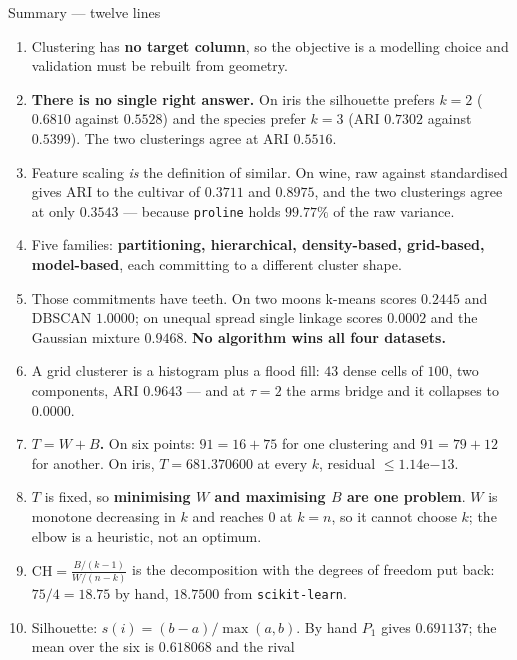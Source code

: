 \documentclass[aspectratio=169]{beamer}
\begin{document}
\begin{frame}[shrink=22]{Summary --- twelve lines}
  \begin{enumerate}\small
    \item Clustering has \textbf{no target column}, so the objective is a
      modelling choice and validation must be rebuilt from geometry.
    \item \textbf{There is no single right answer.} On iris the silhouette
      prefers $k=2$ ($0.6810$ against $0.5528$) and the species prefer $k=3$
      (ARI $0.7302$ against $0.5399$). The two clusterings agree at ARI
      $\mathbf{0.5516}$.
    \item Feature scaling \emph{is} the definition of similar. On wine,
      raw against standardised gives ARI to the cultivar of $0.3711$ and
      $\mathbf{0.8975}$, and the two clusterings agree at only $0.3543$ ---
      because \texttt{proline} holds $99.77\%$ of the raw variance.
    \item Five families: \textbf{partitioning, hierarchical, density-based,
      grid-based, model-based}, each committing to a different cluster shape.
    \item Those commitments have teeth. On two moons k-means scores
      $\mathbf{0.2445}$ and DBSCAN $\mathbf{1.0000}$; on unequal spread
      single linkage scores $\mathbf{0.0002}$ and the Gaussian mixture
      $0.9468$. \textbf{No algorithm wins all four datasets.}
    \item A grid clusterer is a histogram plus a flood fill: $43$ dense
      cells of $100$, two components, ARI $0.9643$ --- and at $\tau = 2$ the
      arms bridge and it collapses to $\mathbf{0.0000}$.
    \item \textbf{$T = W + B$.} On six points: $91 = 16 + 75$ for one
      clustering and $91 = 79 + 12$ for another. On iris,
      $T = 681.370600$ at every $k$, residual $\leq 1.14\text{e}{-13}$.
    \item $T$ is fixed, so \textbf{minimising $W$ and maximising $B$ are one
      problem}. $W$ is monotone decreasing in $k$ and reaches $0$ at $k = n$,
      so it cannot choose $k$; the elbow is a heuristic, not an optimum.
    \item $\mathrm{CH} = \frac{B/(k-1)}{W/(n-k)}$ is the decomposition with
      the degrees of freedom put back: $75/4 = 18.75$ by hand, $18.7500$ from
      \texttt{scikit-learn}.
    \item Silhouette: $s(i) = (b-a)/\max(a,b)$. By hand $P_1$ gives
      $\mathbf{0.691137}$; the mean over the six is $0.618068$ and the rival

\end{enumerate}
\end{frame}
\end{document}
